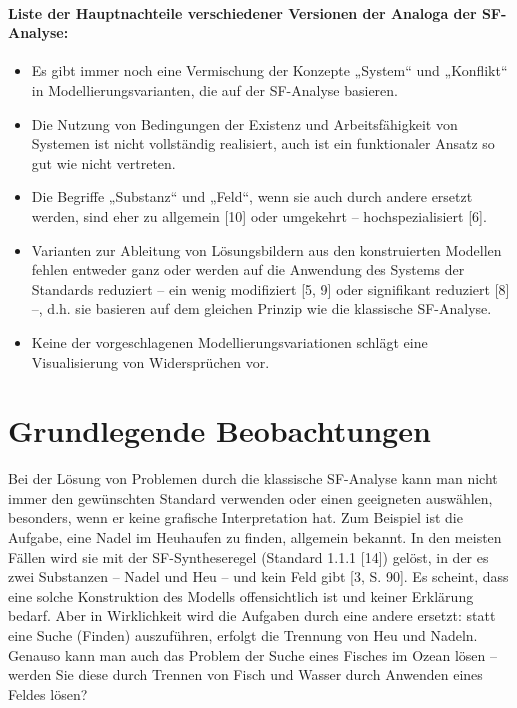 \documentclass[11pt,a4paper]{article}
\begin{document}
\paragraph{Liste der Hauptnachteile verschiedener Versionen der Analoga der
  SF-Analyse:}
\begin{itemize}
\item Es gibt immer noch eine Vermischung der Konzepte „System“ und „Konflikt“
  in Modellierungsvarianten, die auf der SF-Analyse basieren.
\item Die Nutzung von Bedingungen der Existenz und Arbeitsfähigkeit von
  Systemen ist nicht vollständig realisiert, auch ist ein funktionaler Ansatz
  so gut wie nicht vertreten.
\item Die Begriffe „Substanz“ und „Feld“, wenn sie auch durch andere ersetzt
  werden, sind eher zu allgemein [10] oder umgekehrt -- hochspezialisiert [6].
\item Varianten zur Ableitung von Lösungsbildern aus den konstruierten
  Modellen fehlen entweder ganz oder werden auf die Anwendung des Systems der
  Standards reduziert -- ein wenig modifiziert [5, 9] oder signifikant
  reduziert [8] --, d.h. sie basieren auf dem gleichen Prinzip wie die
  klassische SF-Analyse.
\item Keine der vorgeschlagenen Modellierungsvariationen schlägt eine
  Visualisierung von Widersprüchen vor.
\end{itemize}

\section*{Grundlegende Beobachtungen}

Bei der Lösung von Problemen durch die klassische SF-Analyse kann man nicht
immer den gewünschten Standard verwenden oder einen geeigneten auswählen,
besonders, wenn er keine grafische Interpretation hat.  Zum Beispiel ist die
Aufgabe, eine Nadel im Heuhaufen zu finden, allgemein bekannt.  In den
meisten Fällen wird sie mit der SF-Syntheseregel (Standard 1.1.1 [14]) gelöst,
in der es zwei Substanzen -- Nadel und Heu -- und kein Feld gibt [3, S. 90].
Es scheint, dass eine solche Konstruktion des Modells offensichtlich ist und
keiner Erklärung bedarf. Aber in Wirklichkeit wird die Aufgaben durch eine
andere ersetzt: statt eine Suche (Finden) auszuführen, erfolgt die Trennung
von Heu und Nadeln.  Genauso kann man auch das Problem der Suche eines Fisches
im Ozean lösen -- werden Sie diese durch Trennen von Fisch und Wasser durch
Anwenden eines Feldes lösen?
\end{document}

